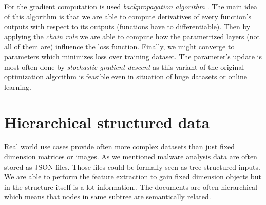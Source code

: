 For the gradient computation is used \emph{backpropagation algorithm} \cite{Rumelhart1988}. The main idea of this algorithm is that we are able to compute derivatives of every function's outputs with respect to its outputs (functions have to differentiable). Then by applying the \emph{chain rule} we are able to compute how the parametrized layers (not all of them are) influence the loss function. Finally, we might converge to parameters which minimizes loss over training dataset. The parameter's update is most often done by \emph{stochastic gradient descent} \cite{Kiefer1952} as this variant of the original optimization algorithm is feasible even in situation of huge datasets or online learning.







\section{Hierarchical structured data}
Real world use cases provide often more complex datasets than just fixed dimension matrices or images. As we mentioned malware analysis data are often stored as JSON files. Those files could be formally seen as tree-structured inputs. We are able to perform the feature extraction to gain fixed dimension objects but in the structure itself is a lot information.\cite{PevnyDedic2020}.  The documents are often hierarchical which means that nodes in same subtree are semantically related. 

